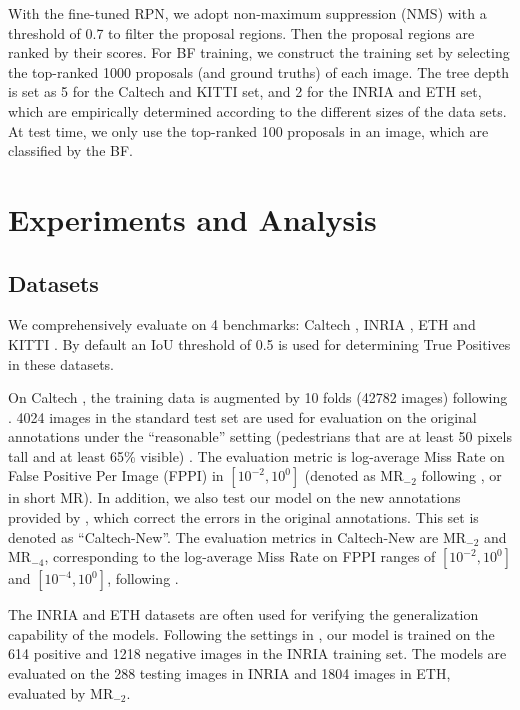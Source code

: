 \documentclass[runningheads]{llncs}
\begin{document}
With the fine-tuned RPN, we adopt non-maximum suppression (NMS) with a threshold of 0.7 to filter the proposal regions. Then the proposal regions are ranked by their scores. 
For BF training, we construct the training set by selecting the top-ranked 1000 proposals (and ground truths) of each image. The tree depth is set as 5 for the Caltech and KITTI set, and 2 for the INRIA and ETH set, which are empirically determined according to the different sizes of the data sets. At test time, we only use the top-ranked 100 proposals in an image, which are classified by the BF.

\section{Experiments and Analysis}

\subsection{Datasets}

We comprehensively evaluate on 4 benchmarks: Caltech \cite{dollar2012pedestrian}, INRIA \cite{dalal2005histograms}, ETH \cite{ess2007depth} and KITTI \cite{geiger2012kitti}. By default an IoU threshold of 0.5 is used for determining True Positives in these datasets.

On Caltech \cite{dollar2012pedestrian}, the training data is augmented by 10 folds (42782 images) following \cite{hosang2015taking}. 4024 images in the standard test set are used for evaluation on the original annotations under the ``reasonable''  setting (pedestrians that are at least 50 pixels tall and at least 65\% visible) \cite{dollar2012pedestrian}. The evaluation metric is log-average Miss Rate on False Positive Per Image (FPPI) in $[10^{-2}, 10^{0}]$ (denoted as MR$_{-2}$ following \cite{Zhang2016}, or in short MR). In addition, we also test our model on the new annotations provided by \cite{Zhang2016}, which correct the errors in the original annotations. This set is denoted as ``Caltech-New''. The evaluation metrics in Caltech-New are MR$_{-2}$ and MR$_{-4}$, corresponding to the log-average Miss Rate on FPPI ranges of $[10^{-2}, 10^{0}]$ and $[10^{-4}, 10^{0}]$, following \cite{Zhang2016}.

The INRIA \cite{dalal2005histograms} and ETH \cite{ess2007depth} datasets are often used for verifying the generalization capability of the models. Following the settings in  \cite{paisitkriangkrai2014strengthening}, our model is trained on the 614 positive and 1218 negative images in the INRIA training set. The models are evaluated on the 288 testing images in INRIA and 1804 images in ETH, evaluated by MR$_{-2}$.
\end{document}
